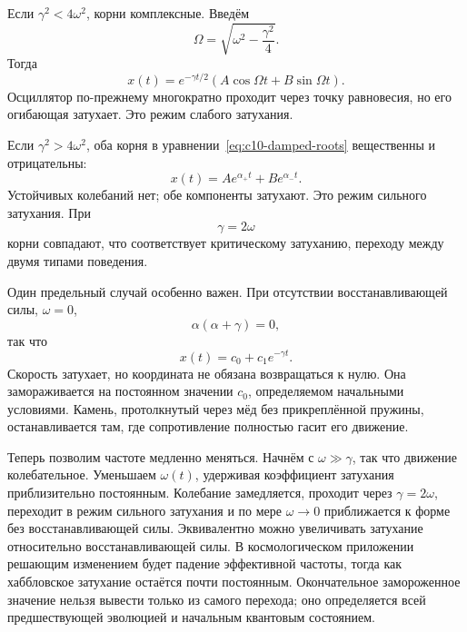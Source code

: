 \begin{classroomqa}
\end{classroomqa}

Если \(\gamma^2<4\omega^2\), корни комплексные. Введём
\[
\Omega=\sqrt{\omega^2-\frac{\gamma^2}{4}}.
\]
Тогда
\begin{equation}
x(t)=e^{-\gamma t/2}
\left(A\cos\Omega t+B\sin\Omega t\right).
\label{eq:c10-underdamped}
\end{equation}
Осциллятор по-прежнему многократно проходит через точку равновесия, но его огибающая затухает. Это режим слабого затухания.

Если \(\gamma^2>4\omega^2\), оба корня в уравнении~\eqref{eq:c10-damped-roots} вещественны и отрицательны:
\begin{equation}
x(t)=A e^{\alpha_+t}+B e^{\alpha_-t}.
\label{eq:c10-overdamped}
\end{equation}
Устойчивых колебаний нет; обе компоненты затухают. Это режим сильного затухания. При
\begin{equation}
\gamma=2\omega
\label{eq:c10-critical}
\end{equation}
корни совпадают, что соответствует критическому затуханию, переходу между двумя типами поведения.

Один предельный случай особенно важен. При отсутствии восстанавливающей силы, \(\omega=0\),
\[
\alpha(\alpha+\gamma)=0,
\]
так что
\begin{equation}
x(t)=c_0+c_1e^{-\gamma t}.
\label{eq:c10-no-restoring}
\end{equation}
Скорость затухает, но координата не обязана возвращаться к нулю. Она замораживается на постоянном значении \(c_0\), определяемом начальными условиями. Камень, протолкнутый через мёд без прикреплённой пружины, останавливается там, где сопротивление полностью гасит его движение.

Теперь позволим частоте медленно меняться. Начнём с \(\omega\gg\gamma\), так что движение колебательное. Уменьшаем \(\omega(t)\), удерживая коэффициент затухания приблизительно постоянным. Колебание замедляется, проходит через \(\gamma=2\omega\), переходит в режим сильного затухания и по мере \(\omega\to0\) приближается к форме без восстанавливающей силы. Эквивалентно можно увеличивать затухание относительно восстанавливающей силы. В космологическом приложении решающим изменением будет падение эффективной частоты, тогда как хаббловское затухание остаётся почти постоянным. Окончательное замороженное значение нельзя вывести только из самого перехода; оно определяется всей предшествующей эволюцией и начальным квантовым состоянием.

